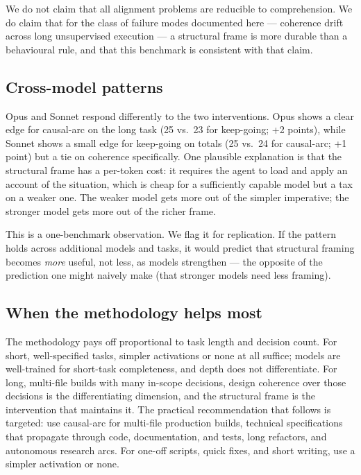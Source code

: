 \documentclass[11pt]{article}
\begin{document}
We do not claim that all alignment problems are reducible to
comprehension. We do claim that for the class of failure modes documented
here --- coherence drift across long unsupervised execution --- a
structural frame is more durable than a behavioural rule, and that this
benchmark is consistent with that claim.

\subsection{Cross-model patterns}

Opus and Sonnet respond differently to the two interventions. Opus shows
a clear edge for causal-arc on the long task (25 vs.\ 23 for keep-going;
+2 points), while Sonnet shows a small edge for keep-going on totals
(25 vs.\ 24 for causal-arc; +1 point) but a tie on coherence specifically.
One plausible explanation is that the structural frame has a per-token
cost: it requires the agent to load and apply an account of the situation,
which is cheap for a sufficiently capable model but a tax on a weaker one.
The weaker model gets more out of the simpler imperative; the stronger
model gets more out of the richer frame.

This is a one-benchmark observation. We flag it for replication. If the
pattern holds across additional models and tasks, it would predict that
structural framing becomes \emph{more} useful, not less, as models
strengthen --- the opposite of the prediction one might naively make
(that stronger models need less framing).

\subsection{When the methodology helps most}

The methodology pays off proportional to task length and decision count.
For short, well-specified tasks, simpler activations or none at all
suffice; models are well-trained for short-task completeness, and depth
does not differentiate. For long, multi-file builds with many in-scope
decisions, design coherence over those decisions is the differentiating
dimension, and the structural frame is the intervention that maintains it.
The practical recommendation that follows is targeted: use causal-arc for
multi-file production builds, technical specifications that propagate
through code, documentation, and tests, long refactors, and autonomous
research arcs. For one-off scripts, quick fixes, and short writing, use a
simpler activation or none.
\end{document}
